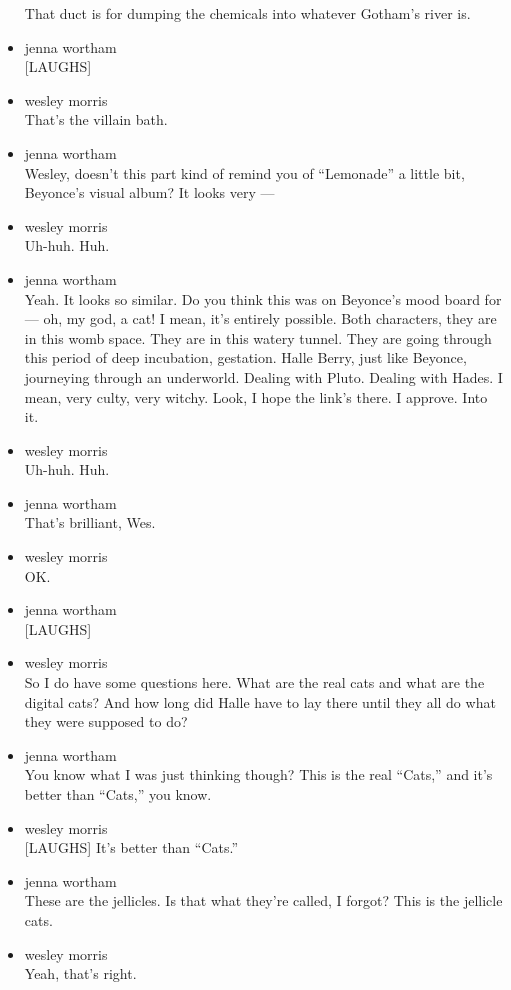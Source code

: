 \begin{itemize}
  That duct is for dumping the chemicals into whatever Gotham's river
  is.
\item
  jenna wortham\\
  {[}LAUGHS{]}
\item
  wesley morris\\
  That's the villain bath.
\item
  jenna wortham\\
  Wesley, doesn't this part kind of remind you of ``Lemonade'' a little
  bit, Beyonce's visual album? It looks very ---
\item
  wesley morris\\
  Uh-huh. Huh.
\item
  jenna wortham\\
  Yeah. It looks so similar. Do you think this was on Beyonce's mood
  board for --- oh, my god, a cat! I mean, it's entirely possible. Both
  characters, they are in this womb space. They are in this watery
  tunnel. They are going through this period of deep incubation,
  gestation. Halle Berry, just like Beyonce, journeying through an
  underworld. Dealing with Pluto. Dealing with Hades. I mean, very
  culty, very witchy. Look, I hope the link's there. I approve. Into it.
\item
  wesley morris\\
  Uh-huh. Huh.
\item
  jenna wortham\\
  That's brilliant, Wes.
\item
  wesley morris\\
  OK.
\item
  jenna wortham\\
  {[}LAUGHS{]}
\item
  wesley morris\\
  So I do have some questions here. What are the real cats and what are
  the digital cats? And how long did Halle have to lay there until they
  all do what they were supposed to do?
\item
  jenna wortham\\
  You know what I was just thinking though? This is the real ``Cats,''
  and it's better than ``Cats,'' you know.
\item
  wesley morris\\
  {[}LAUGHS{]} It's better than ``Cats.''
\item
  jenna wortham\\
  These are the jellicles. Is that what they're called, I forgot? This
  is the jellicle cats.
\item
  wesley morris\\
  Yeah, that's right.


\end{itemize}
